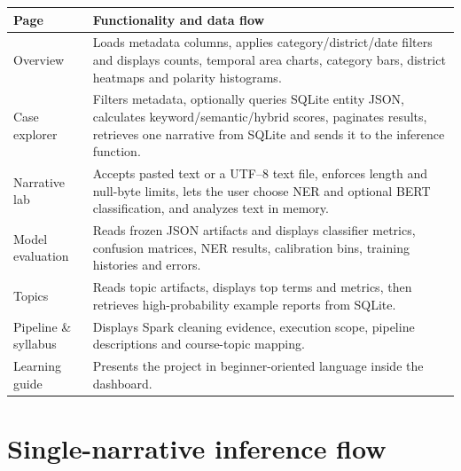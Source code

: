 \documentclass[12pt,a4paper]{report}
\begin{document}
\begin{longtable}{p{}p{}}
\toprule
Page & Functionality and data flow \\
\midrule
\endhead
Overview & Loads metadata columns, applies category/district/date filters and displays counts, temporal area charts, category bars, district heatmaps and polarity histograms. \\
Case explorer & Filters metadata, optionally queries SQLite entity JSON, calculates keyword/semantic/hybrid scores, paginates results, retrieves one narrative from SQLite and sends it to the inference function. \\
Narrative lab & Accepts pasted text or a UTF--8 text file, enforces length and null-byte limits, lets the user choose NER and optional BERT classification, and analyzes text in memory. \\
Model evaluation & Reads frozen JSON artifacts and displays classifier metrics, confusion matrices, NER results, calibration bins, training histories and errors. \\
Topics & Reads topic artifacts, displays top terms and metrics, then retrieves high-probability example reports from SQLite. \\
Pipeline \& syllabus & Displays Spark cleaning evidence, execution scope, pipeline descriptions and course-topic mapping. \\
Learning guide & Presents the project in beginner-oriented language inside the dashboard. \\
\bottomrule
\end{longtable}

\section{Single-narrative inference flow}
\end{document}
